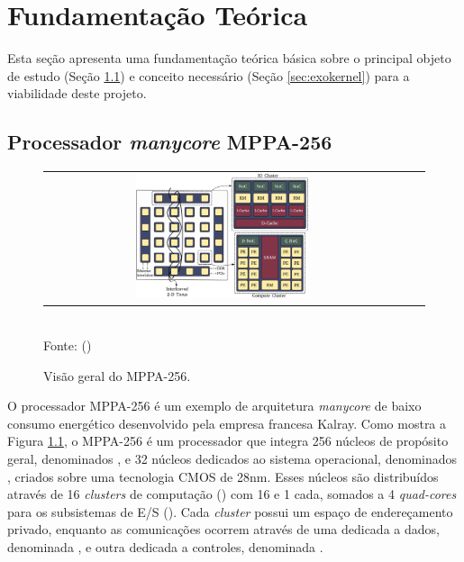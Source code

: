 \documentclass[
  12pt,       %
  openright,      %
  twoside,      %
  a4paper,      %
  english,      %
  brazil,       %
  ]{abntex2}
\begin{document}
\chapter{Fundamentação Teórica}
\label{sec:fundamentacao}

    Esta seção apresenta uma fundamentação teórica básica sobre o
    principal objeto de estudo (Seção \ref{sec:mppa}) e conceito necessário
    (Seção \ref{sec:exokernel}) para a viabilidade deste projeto.

    \section{Processador \textit{manycore} MPPA-256}
    \label{sec:mppa}
    
        \begin{figure}[t]
            \begin{center}
                \caption{Visão geral do MPPA-256.}
                    \label{figmppa}
                \begin{tabular}{ccc}
                    \includegraphics[width=0.5\textwidth]{figs/mppa-overview.pdf}\\
                \end{tabular}
                \vspace{1ex} \\
                Fonte: ()
            \end{center}
            \vspace{-2ex}
        \end{figure}
    
        O processador MPPA-256 é um exemplo de arquitetura \textit{manycore}
        de baixo consumo energético \cite{Castro-IA3:2013} desenvolvido pela
        empresa francesa Kalray. Como mostra a Figura \ref{figmppa}, o MPPA-256
        é um processador que integra 256 núcleos de propósito geral,
        denominados \pes, e 32 núcleos dedicados ao sistema operacional,
        denominados \rmans, criados sobre uma tecnologia CMOS de 28nm.
        Esses núcleos são distribuídos através de 16 \textit{clusters} de
        computação (\cpclusters) com 16 \pes e 1 \rman cada, somados a 
        4 \textit{quad-cores} para os subsistemas de E/S (\ioclusters).
        Cada \textit{cluster} possui um espaço de endereçamento privado,
        enquanto as comunicações ocorrem através de uma \noc dedicada a
        dados, denominada \dnoc, e outra dedicada a controles, denominada \cnoc.
            
\end{document}
